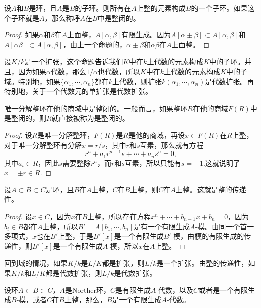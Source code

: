 \para \label{iope}设$A$和$B$是环，且$A$是$B$的子环。则所有在$A$上整的元素构成$B$的一个子环。如果这个子环就是$A$，那么称呼$A$在$B$中是整闭的。

\begin{proof} 如果$\alpha$和$\beta$在$A$上面整，$A[\alpha,\beta]$有限生成。因为$A[\alpha\pm\beta]\subset A[\alpha,\beta]$和$A[\alpha\beta]\subset A[\alpha,\beta]$，由上一个命题的，$\alpha\pm\beta$和$\alpha\beta$在$A$上面整。\end{proof}

设$K/k$是一个扩张，这个命题告诉我们$K$中在$k$上代数的元素构成$K$中的子环。并且，因为如果$\alpha$代数，那么$1/\alpha$也代数，所以$K$中在$k$上代数的元素构成$K$中的子域。特别地，如果$\{\alpha_1,\cdots,\alpha_n\}$都在$k$上代数，则扩张$k(\alpha_1,\cdots,\alpha_n)$是代数扩张。再特别地，关于一个代数元的单扩张是代数扩张。

\para 唯一分解整环在他的商域中是整闭的。一般而言，如果整环$R$在他的商域$F(R)$中是整闭的，则$R$就直接被称为是整闭的。

\begin{proof} 
	设$R$是唯一分解整环，$F(R)$是$R$是他的商域，再设$x\in F(R)$在$R$上整，对于唯一分解整环有分解$x=r/s$，其中$r$和$s$互素，那么就有方程
	\[
		r^n+a_1r^{n-1}s+\cdots+a_n s^n=0,
	\]
	其中$a_i\in R$，因此$s$需要整除$r^n$，而$r$和$s$互素，所以只能有$s=\pm 1$.这就说明了$x=\pm r\in R$.
\end{proof}

\begin{pro}
设$A\subset B\subset C$是环，且$B$在$A$上整，$C$在$B$上整，则$C$在$A$上整。这就是整的传递性。
\end{pro}

\begin{proof} 
	设$x\in C$，因为$x$在$B$上整，所以存在方程$x^n+\cdots+b_{n-1}x+b_n=0$，因为$b_i\in B$都在$A$上整，所以$B'=A[b_1,\cdots,b_n]$是有一个有限生成$A$-模。由同一个首一多项式，$x$也在$B'$上整，于是$B'[x]$是一个有限生成$B'$-模，由模的有限生成的传递性，则$B'[x]$是一个有限生成$A$-模，所以$x$在$A$上整。
\end{proof}

回到域的情况，如果$K/k$是$L/K$都是扩张，则$L/k$是一个扩张。由整的传递性，如果$K/k$和$L/K$都是代数扩张，则$L/k$是代数扩张。

\begin{pro}\label{p:2.4}
设环$A\subset B\subset C$，$A$是Norther环，$C$是有限生成$A$-代数，以及$C$或者是一个有限生成$B$-模，或者$C$在$B$上整，那么，$B$是一个有限生成$A$-代数。
\end{pro}

